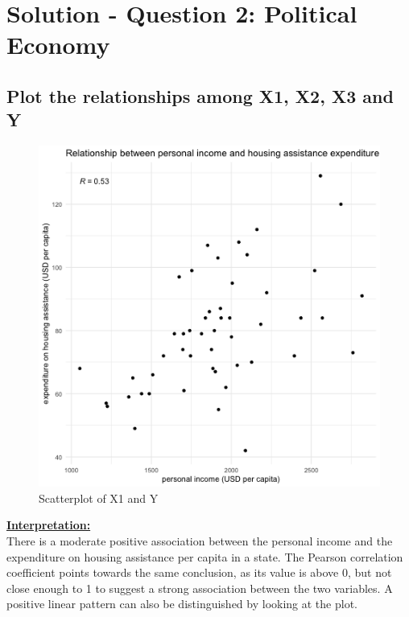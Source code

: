 \documentclass[12pt,letterpaper]{article}
\begin{document}
	\section*{Solution - Question 2: Political Economy}
	\subsection*{Plot the relationships among X1, X2, X3 and Y}
 
\vspace{.5cm}
\begin{figure}[h!]\centering
	\caption{\footnotesize Scatterplot of X1 and Y}
	\label{fig:plot_1}
	\includegraphics[width=.7\textwidth]{scatter_x1_y.png}
\end{figure} 
\vspace{.5cm}
\underline{\textbf{Interpretation:}}\\[.3cm]There is a moderate positive association between the personal income and the expenditure on housing assistance per capita in a state. The Pearson correlation coefficient points towards the same conclusion, as its value is above 0, but not close enough to 1 to suggest a strong association between the two variables. A positive linear pattern can also be distinguished by looking at the plot. 
\newpage
 
\vspace{.5cm}
\end{document}
